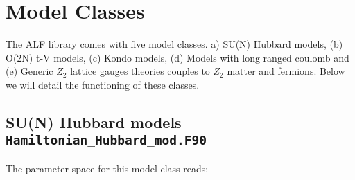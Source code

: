 

\section{  Model Classes }

The ALF  library comes with five model classes. a) SU(N) Hubbard models, (b)  O(2N) t-V models, (c)   Kondo models, (d)    Models with long ranged coulomb and (e)  Generic $Z_2$ lattice gauges theories couples to $Z_2$ matter  and fermions.   Below we will 
detail the functioning of these classes.  


\subsection{ SU(N) Hubbard models   \texttt{Hamiltonian\_Hubbard\_mod.F90}}

The parameter space for this model class  reads: 

